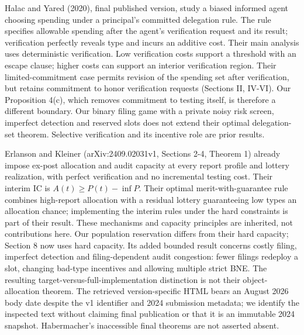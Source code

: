 \documentclass[
  11pt,
]{article}
\begin{document}
Halac and Yared (2020), final published version, study a biased informed
agent choosing spending under a principal's committed delegation rule.
The rule specifies allowable spending after the agent's verification
request and its result; verification perfectly reveals type and incurs
an additive cost. Their main analysis uses deterministic verification.
Low verification costs support a threshold with an escape clause; higher
costs can support an interior verification region. Their
limited-commitment case permits revision of the spending set after
verification, but retains commitment to honor verification requests
(Sections II, IV-VI). Our Proposition 4(c), which removes commitment to
testing itself, is therefore a different boundary. Our binary filing
game with a private noisy risk screen, imperfect detection and reserved
slots does not extend their optimal delegation-set theorem. Selective
verification and its incentive role are prior results.

Erlanson and Kleiner (arXiv:2409.02031v1, Sections 2-4, Theorem 1)
already impose ex-post allocation and audit capacity at every report
profile and lottery realization, with perfect verification and no
incremental testing cost. Their interim IC is \(A(t)\geq P(t)-\inf P\).
Their optimal merit-with-guarantee rule combines high-report allocation
with a residual lottery guaranteeing low types an allocation chance;
implementing the interim rules under the hard constraints is part of
their result. These mechanisms and capacity principles are inherited,
not contributions here. Our population reservation differs from their
hard capacity; Section 8 now uses hard capacity. Its added bounded
result concerns costly filing, imperfect detection and filing-dependent
audit congestion: fewer filings redeploy a slot, changing bad-type
incentives and allowing multiple strict BNE. The resulting
target-versus-full-implementation distinction is not their
object-allocation theorem. The retrieved version-specific HTML bears an
August 2026 body date despite the v1 identifier and 2024 submission
metadata; we identify the inspected text without claiming final
publication or that it is an immutable 2024 snapshot. Habermacher's
inaccessible final theorems are not asserted absent.
\end{document}
